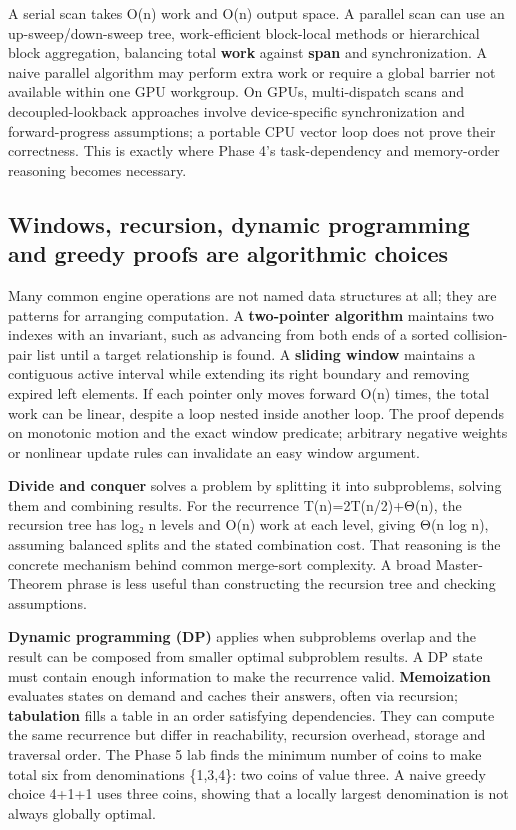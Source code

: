A serial scan takes O(n) work and O(n) output space. A parallel scan can use an up-sweep/down-sweep tree, work-efficient block-local methods or hierarchical block aggregation, balancing total \textbf{work} against \textbf{span} and synchronization. A naive parallel algorithm may perform extra work or require a global barrier not available within one GPU workgroup. On GPUs, multi-dispatch scans and decoupled-lookback approaches involve device-specific synchronization and forward-progress assumptions; a portable CPU vector loop does not prove their correctness. This is exactly where Phase 4's task-dependency and memory-order reasoning becomes necessary.

\subsection{Windows, recursion, dynamic programming and greedy proofs are algorithmic choices}\label{05-engine-i-ch008-windows-recursion-dynamic-programming-and-greedy-proofs-are-algorithmic-choices}

\hypertarget{05-engine-i-ch008-windows-recursion-dynamic-programming-and-greedy-proofs-are-algorithmic-choices}{}

Many common engine operations are not named data structures at all; they are patterns for arranging computation. A \textbf{two-pointer algorithm} maintains two indexes with an invariant, such as advancing from both ends of a sorted collision-pair list until a target relationship is found. A \textbf{sliding window} maintains a contiguous active interval while extending its right boundary and removing expired left elements. If each pointer only moves forward O(n) times, the total work can be linear, despite a loop nested inside another loop. The proof depends on monotonic motion and the exact window predicate; arbitrary negative weights or nonlinear update rules can invalidate an easy window argument.

\textbf{Divide and conquer} solves a problem by splitting it into subproblems, solving them and combining results. For the recurrence T(n)=2T(n/2)+Θ(n), the recursion tree has log₂ n levels and O(n) work at each level, giving Θ(n log n), assuming balanced splits and the stated combination cost. That reasoning is the concrete mechanism behind common merge-sort complexity. A broad Master-Theorem phrase is less useful than constructing the recursion tree and checking assumptions.

\textbf{Dynamic programming (DP)} applies when subproblems overlap and the result can be composed from smaller optimal subproblem results. A DP state must contain enough information to make the recurrence valid. \textbf{Memoization} evaluates states on demand and caches their answers, often via recursion; \textbf{tabulation} fills a table in an order satisfying dependencies. They can compute the same recurrence but differ in reachability, recursion overhead, storage and traversal order. The Phase 5 lab finds the minimum number of coins to make total six from denominations \{1,3,4\}: two coins of value three. A naive greedy choice 4+1+1 uses three coins, showing that a locally largest denomination is not always globally optimal.

